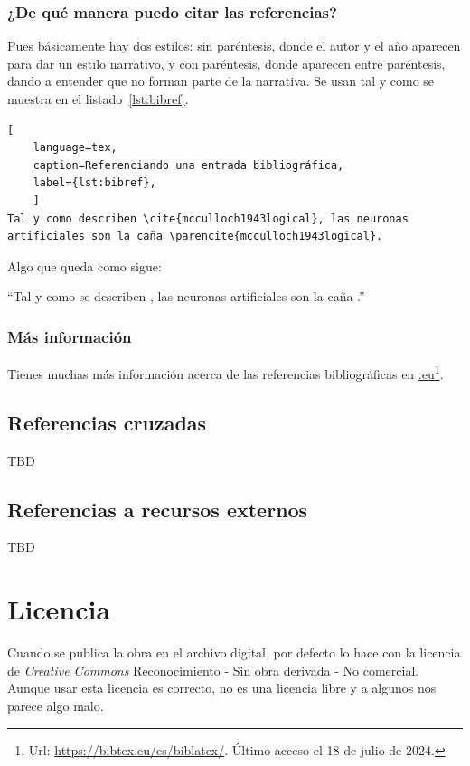 \documentclass[%
    school=etsisi,%
    degree=61TI,%
]{upm-report}
\begin{document}
\subsection{¿De qué manera puedo citar las referencias?}

Pues básicamente hay dos estilos: sin paréntesis, donde el autor y el
año aparecen para dar un estilo narrativo, y con paréntesis, donde
aparecen entre paréntesis, dando a entender que no forman parte de la
narrativa. Se usan tal y como se muestra en el listado~\ref{lst:bibref}.

\begin{lstlisting}[
    language=tex,
    caption=Referenciando una entrada bibliográfica,
    label={lst:bibref},
    ]
Tal y como describen \cite{mcculloch1943logical}, las neuronas
artificiales son la caña \parencite{mcculloch1943logical}.
\end{lstlisting}

Algo que queda como sigue:

\enquote{Tal y como se describen \cite{mcculloch1943logical}, las
neuronas artificiales son la caña \parencite{mcculloch1943logical}.}

\subsection{Más información}

Tienes muchas más información acerca de las referencias bibliográficas
en \href{https://bibtex.eu/es/biblatex/}{.eu}\footnote{
Url: \url{https://bibtex.eu/es/biblatex/}. Último acceso el 18 de julio
de 2024.}.

\section{Referencias cruzadas}

TBD

\section{Referencias a recursos externos}

TBD

\chapter{Licencia}
\label{ch:licencia}

Cuando se publica la obra en el archivo digital, por defecto lo hace con la licencia de \textit{Creative Commons} Reconocimiento - Sin obra derivada - No comercial. Aunque usar esta licencia es correcto, no es una licencia libre y a algunos nos parece algo malo.
\end{document}
